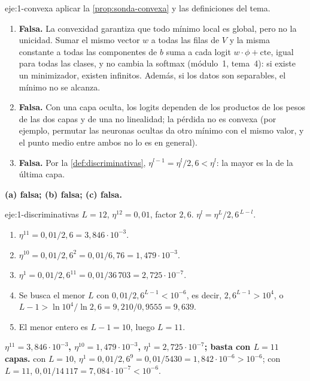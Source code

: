 \begin{solucion}{eje:1-convexa}
\planteamiento aplicar la \cref{prop:sonda-convexa} y las definiciones del tema.
\pasos
\begin{enumerate}[label=(\alph*)]
  \item \textbf{Falsa.} La convexidad garantiza que todo mínimo local es global, pero no la unicidad. Sumar el mismo vector $w$ a todas las filas de $V$ y la misma constante a todas las componentes de $b$ suma a cada logit $w\cdot\phi+\text{cte}$, igual para todas las clases, y no cambia la softmax (módulo~1, tema~4): si existe un minimizador, existen infinitos. Además, si los datos son separables, el mínimo no se alcanza.
  \item \textbf{Falsa.} Con una capa oculta, los logits dependen de los productos de los pesos de las dos capas y de una no linealidad; la pérdida no es convexa (por ejemplo, permutar las neuronas ocultas da otro mínimo con el mismo valor, y el punto medio entre ambos no lo es en general).
  \item \textbf{Falsa.} Por la \cref{def:discriminativas}, $\eta^{l-1}=\eta^{l}/2{,}6<\eta^{l}$: la mayor es la de la última capa.
\end{enumerate}
\resultado \textbf{(a) falsa; (b) falsa; (c) falsa.}
\end{solucion}

\begin{solucion}{eje:1-discriminativas}
\datos $L=12$, $\eta^{12}=0{,}01$, factor $2{,}6$.
\planteamiento $\eta^{l}=\eta^{L}/2{,}6^{\,L-l}$.
\pasos
\begin{enumerate}[label=\arabic*.]
  \item $\eta^{11}=0{,}01/2{,}6=3{,}846\cdot 10^{-3}$.
  \item $\eta^{10}=0{,}01/2{,}6^{2}=0{,}01/6{,}76=1{,}479\cdot 10^{-3}$.
  \item $\eta^{1}=0{,}01/2{,}6^{11}=0{,}01/36\,703=2{,}725\cdot 10^{-7}$.
  \item Se busca el menor $L$ con $0{,}01/2{,}6^{L-1}<10^{-6}$, es decir, $2{,}6^{L-1}>10^{4}$, o $L-1>\ln 10^{4}/\ln 2{,}6=9{,}210/0{,}9555=9{,}639$.
  \item El menor entero es $L-1=10$, luego $L=11$.
\end{enumerate}
\resultado \textbf{$\eta^{11}=3{,}846\cdot 10^{-3}$, $\eta^{10}=1{,}479\cdot 10^{-3}$, $\eta^{1}=2{,}725\cdot 10^{-7}$; basta con $L=11$ capas.}
\comprobacion con $L=10$, $\eta^{1}=0{,}01/2{,}6^{9}=0{,}01/5430=1{,}842\cdot 10^{-6}>10^{-6}$; con $L=11$, $0{,}01/14\,117=7{,}084\cdot 10^{-7}<10^{-6}$.
\end{solucion}

